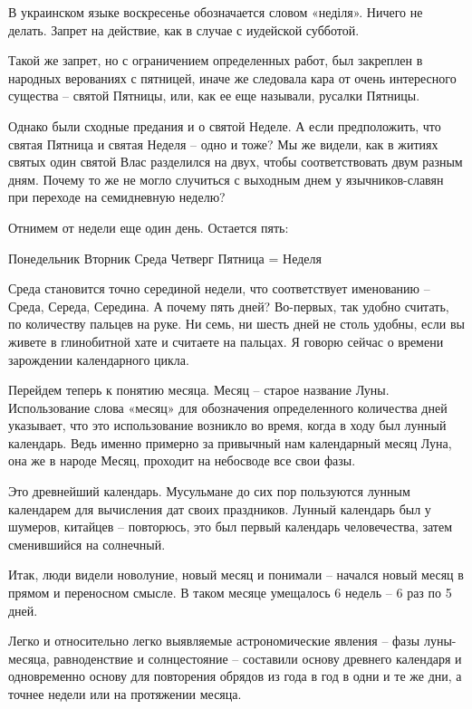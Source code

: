 В украинском языке воскресенье обозначается словом «неділя». Ничего не делать. Запрет на действие, как в случае с иудейской субботой.

   Такой же запрет, но с ограничением определенных работ, был закреплен в народных верованиях с пятницей, иначе же следовала кара от очень интересного существа – святой Пятницы, или, как ее еще называли, русалки Пятницы.

Однако были сходные предания и о святой Неделе. А если предположить, что святая Пятница и святая Неделя – одно и тоже? Мы же видели, как в житиях святых один святой Влас разделился на двух, чтобы соответствовать двум разным дням. Почему то же не могло случиться с выходным днем у язычников-славян при переходе на семидневную неделю?

Отнимем от недели еще один день. Остается пять:\newline 

\noindent Понедельник\newline
Вторник\newline
Среда\newline
Четверг\newline
Пятница = Неделя\newline

Среда становится точно серединой недели, что соответствует именованию – Среда, Середа, Середина. А почему пять дней? Во-первых, так удобно считать, по количеству пальцев на руке. Ни семь, ни шесть дней не столь удобны, если вы живете в глинобитной хате и считаете на пальцах. Я говорю сейчас о времени зарождении календарного цикла.

   Перейдем теперь к понятию месяца. Месяц – старое название Луны. Использование слова «месяц» для обозначения определенного количества дней указывает, что это использование возникло во время, когда в ходу был лунный календарь. Ведь именно примерно за привычный нам календарный месяц Луна, она же в народе Месяц, проходит на небосводе все свои фазы.

   Это древнейший календарь. Мусульмане до сих пор пользуются лунным календарем для вычисления дат своих праздников. Лунный календарь был у шумеров, китайцев – повторюсь, это был первый календарь человечества, затем сменившийся на солнечный.

   Итак, люди видели новолуние, новый месяц и понимали – начался новый месяц в прямом и переносном смысле. В таком месяце умещалось 6 недель – 6 раз по 5 дней.

   Легко и относительно легко выявляемые астрономические явления – фазы луны-месяца, равноденствие и солнцестояние –  составили основу древнего календаря и одновременно основу для повторения обрядов из года в год в одни и те же дни, а точнее недели или на протяжении месяца.

